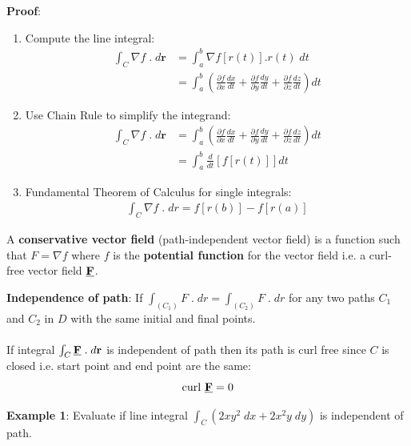 \documentclass[10pt,a4paper]{article}
\begin{document}
\textbf{Proof}:
\begin{enumerate}
    \item Compute the line integral:
    \begin{align*}
        \int_C \nabla f\;.\;d \textbf{r} &= \int_a^b \nabla f[r(t)].r(t)\; dt \\
        &= \int_a^b \left(\frac{\partial f}{\partial x}\frac{dx}{dt}+\frac{\partial f}{\partial y}\frac{dy}{dt}+\frac{\partial f}{\partial z}\frac{dz}{dt}\right) dt
    \end{align*}
    \item Use Chain Rule to simplify the integrand:
    \begin{align*}
        \int_C \nabla f\;.\;d \textbf{r} &= \int_a^b \left(\frac{\partial f}{\partial x}\frac{dx}{dt}+\frac{\partial f}{\partial y}\frac{dy}{dt}+\frac{\partial f}{\partial z}\frac{dz}{dt}\right) dt \\ 
        &= \int_a^b \frac{d}{dt}[f[r(t)]] dt 
    \end{align*}
    \item Fundamental Theorem of Calculus for single integrals:
    \begin{align*}
        \int_C \nabla f\;.\;dr = f[r(b)]-f[r(a)]
    \end{align*}
\end{enumerate}

A \textbf{conservative vector field} (path-independent vector field) is a function such that $F = \nabla f$
where $f$ is the \textbf{potential function} for the vector field i.e. a curl-free vector field
$\textbf{\underline{F}}$. 

\begin{tcolorbox}[breakable,colback=white]
    \textbf{Independence of path}: If $\int_{(C_1)}F\;.\;dr = \int_{(C_2)}F\;.\;dr $ for any
    two paths $C_1$ and $C_2$ in $D$ with the same initial and final points.
    \\
    \\
    If integral $\int_C \textbf{\underline{F}}\;.\;d \textbf{r}$ is independent of path then its
    path is curl free since $C$ is closed i.e. start point and end point are the same:
    $$
        \text{curl }\textbf{\underline{F}} = 0
    $$
\end{tcolorbox}

\textbf{Example 1}: Evaluate if line integral $\int_C (2xy^2\; dx + 2x^2y\; dy)$ is independent of
path.
\end{document}
